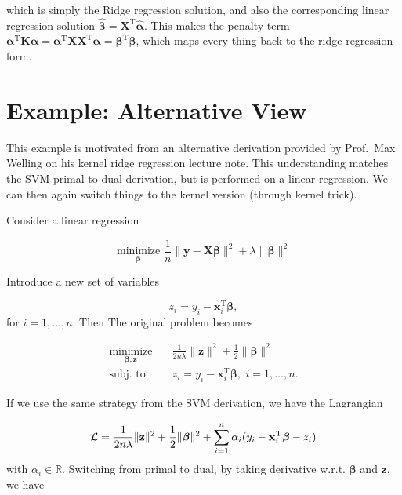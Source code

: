 \documentclass[
]{book}
\theoremstyle{definition}
\theoremstyle{definition}
\theoremstyle{definition}
\theoremstyle{definition}
\theoremstyle{remark}
\begin{document}
which is simply the Ridge regression solution, and also the corresponding linear regression solution \(\widehat{\boldsymbol \beta} = \mathbf{X}^\text{T}\widehat{\boldsymbol \alpha}\). This makes the penalty term \(\boldsymbol \alpha^\text{T}\mathbf{K}\boldsymbol \alpha= \boldsymbol \alpha^\text{T}\mathbf{X}\mathbf{X}^\text{T}\boldsymbol \alpha= \boldsymbol \beta^\text{T}\boldsymbol \beta\), which maps every thing back to the ridge regression form.

\hypertarget{example-alternative-view}{%
\section{Example: Alternative View}\label{example-alternative-view}}

This example is motivated from an alternative derivation provided by Prof.~Max Welling on his kernel ridge regression lecture note. This understanding matches the SVM primal to dual derivation, but is performed on a linear regression. We can then again switch things to the kernel version (through kernel trick).

Consider a linear regression

\[\underset{\boldsymbol \beta}{\text{minimize}} \,\, \frac{1}{n} \lVert \mathbf{y}- \mathbf{X}\boldsymbol \beta\rVert^2 + \lambda \lVert \boldsymbol \beta\rVert^2\]

Introduce a new set of variables

\[z_i = y_i - \mathbf{x}_i^\text{T}\boldsymbol \beta,\]
for \(i = 1, \ldots, n\). Then The original problem becomes

\begin{align}
\underset{\boldsymbol \beta, \mathbf{z}}{\text{minimize}} \quad & \frac{1}{2n\lambda} \lVert \mathbf{z}\rVert^2 + \frac{1}{2} \lVert \boldsymbol \beta\rVert^2 \nonumber \\
\text{subj. to} \quad & z_i = y_i - \mathbf{x}_i^\text{T}\boldsymbol \beta, \,\, i = 1, \ldots, n.
\end{align}

If we use the same strategy from the SVM derivation, we have the Lagrangian

\[{\cal L} = \frac{1}{2n\lambda} \lVert \mathbf{z}\rVert^2 + \frac{1}{2} \lVert \boldsymbol \beta\rVert^2 + \sum_{i=1}^n \alpha_i (y_i - \mathbf{x}_i^\text{T}\boldsymbol \beta- z_i)\]
with \(\alpha_i \in \mathbb{R}\). Switching from primal to dual, by taking derivative w.r.t. \(\boldsymbol \beta\) and \(\mathbf{z}\), we have
\end{document}
